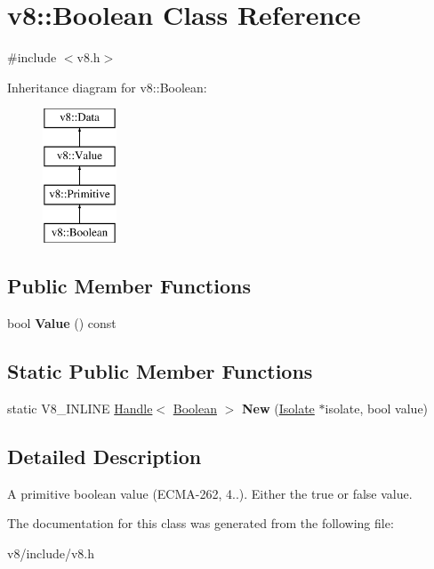 \hypertarget{classv8_1_1Boolean}{}\section{v8\+:\+:Boolean Class Reference}
\label{classv8_1_1Boolean}


{\ttfamily \#include $<$v8.\+h$>$}

Inheritance diagram for v8\+:\+:Boolean\+:\begin{figure}[H]
\begin{center}
\leavevmode
\includegraphics[height=4.000000cm]{classv8_1_1Boolean}
\end{center}
\end{figure}
\subsection*{Public Member Functions}
\begin{DoxyCompactItemize}
\item 
\hypertarget{classv8_1_1Boolean_aa493d54eb43afc64ab796e1cf66ff910}{}bool {\bfseries Value} () const \label{classv8_1_1Boolean_aa493d54eb43afc64ab796e1cf66ff910}

\end{DoxyCompactItemize}
\subsection*{Static Public Member Functions}
\begin{DoxyCompactItemize}
\item 
\hypertarget{classv8_1_1Boolean_a936637bda9841b5150d5bce6181ef808}{}static V8\+\_\+\+I\+N\+L\+I\+N\+E \hyperlink{classv8_1_1Handle}{Handle}$<$ \hyperlink{classv8_1_1Boolean}{Boolean} $>$ {\bfseries New} (\hyperlink{classv8_1_1Isolate}{Isolate} $\ast$isolate, bool value)\label{classv8_1_1Boolean_a936637bda9841b5150d5bce6181ef808}

\end{DoxyCompactItemize}


\subsection{Detailed Description}
A primitive boolean value (E\+C\+M\+A-\/262, 4..). Either the true or false value. 

The documentation for this class was generated from the following file\+:\begin{DoxyCompactItemize}
\item 
v8/include/v8.\+h\end{DoxyCompactItemize}
